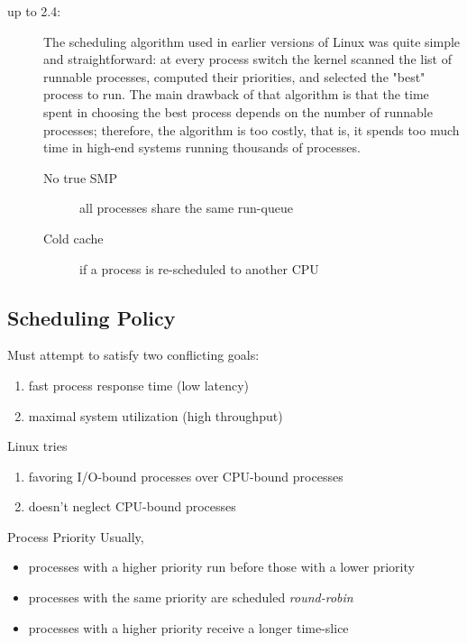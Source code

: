 \begin{description}
\item[up to 2.4:]  The scheduling algorithm used in earlier versions
  of Linux was quite simple and straightforward: at every process switch the kernel
  scanned the list of runnable processes, computed their priorities, and selected the
  "best" process to run. The main drawback of that algorithm is that the time spent in
  choosing the best process depends on the number of runnable processes; therefore, the
  algorithm is too costly, that is, it spends too much time in high-end systems running
  thousands of processes.
  \begin{description}
  \item[No true SMP] all processes share the same run-queue
  \item[Cold cache] if a process is re-scheduled to another CPU
  \end{description}
\end{description}

\subsection{Scheduling Policy}

\begin{frame}
  Must attempt to satisfy two conflicting goals:
  \begin{enumerate}
  \item fast process response time (low latency)
  \item maximal system utilization (high throughput)
  \end{enumerate}
  \vspace{1em}
  
  Linux tries
  \begin{enumerate}
  \item favoring I/O-bound processes over CPU-bound processes
  \item doesn't neglect CPU-bound processes
  \end{enumerate}
\end{frame}

\begin{frame}{Process Priority}
  Usually,
  \begin{itemize}
  \item processes with a higher priority run before those with a lower priority
  \item processes with the same priority are scheduled \emph{round-robin}
  \item processes with a higher priority receive a longer time-slice
  \end{itemize}
\end{frame}

